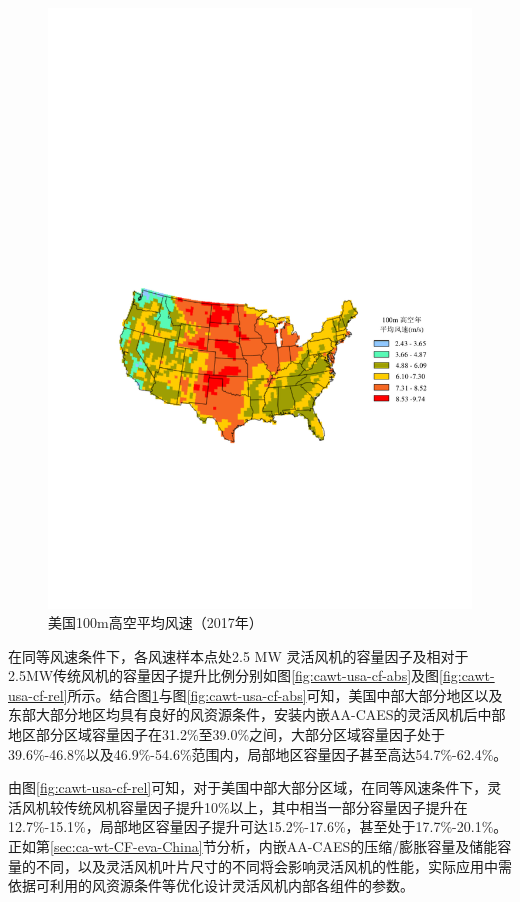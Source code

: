 \begin{figure}[!htp] %
  \centering
  \includegraphics[scale=0.85]{figures/Chap5-8-Wind-Speed-100-2.pdf}
  \caption{美国100m高空平均风速（2017年）}
  \label{fig:wind-speed-100}
\end{figure}

在同等风速条件下，各风速样本点处2.5 MW 灵活风机的容量因子及相对于2.5MW传统风机的容量因子提升比例分别如图\ref{fig:cawt-usa-cf-abs}及图\ref{fig:cawt-usa-cf-rel}所示。结合图\ref{fig:wind-speed-100}与图\ref{fig:cawt-usa-cf-abs}可知，美国中部大部分地区以及东部大部分地区均具有良好的风资源条件，安装内嵌AA-CAES的灵活风机后中部地区部分区域容量因子在31.2\%至39.0\%之间，大部分区域容量因子处于39.6\%-46.8\%以及46.9\%-54.6\%范围内，局部地区容量因子甚至高达54.7\%-62.4\%。

由图\ref{fig:cawt-usa-cf-rel}可知，对于美国中部大部分区域，在同等风速条件下，灵活风机较传统风机容量因子提升10\%以上，其中相当一部分容量因子提升在12.7\%-15.1\%，局部地区容量因子提升可达15.2\%-17.6\%，甚至处于17.7\%-20.1\%。正如第\ref{sec:ca-wt-CF-eva-China}节分析，内嵌AA-CAES的压缩/膨胀容量及储能容量的不同，以及灵活风机叶片尺寸的不同将会影响灵活风机的性能，实际应用中需依据可利用的风资源条件等优化设计灵活风机内部各组件的参数。

